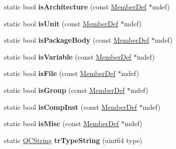 \begin{DoxyCompactItemize}
\item 
\hypertarget{class_vhdl_doc_gen_a70bc0f7e1c425824fc848c9d1eaa5af5}{static bool {\bfseries is\-Architecture} (const \hyperlink{class_member_def}{Member\-Def} $\ast$mdef)}\label{class_vhdl_doc_gen_a70bc0f7e1c425824fc848c9d1eaa5af5}

\item 
\hypertarget{class_vhdl_doc_gen_ad09fd50d897efd1d108c90d51a87c0ad}{static bool {\bfseries is\-Unit} (const \hyperlink{class_member_def}{Member\-Def} $\ast$mdef)}\label{class_vhdl_doc_gen_ad09fd50d897efd1d108c90d51a87c0ad}

\item 
\hypertarget{class_vhdl_doc_gen_acd1b3b462f582006aea12eec1ed47b30}{static bool {\bfseries is\-Package\-Body} (const \hyperlink{class_member_def}{Member\-Def} $\ast$mdef)}\label{class_vhdl_doc_gen_acd1b3b462f582006aea12eec1ed47b30}

\item 
\hypertarget{class_vhdl_doc_gen_abc090ca796d4365e4ec079ce4c8e8e07}{static bool {\bfseries is\-Variable} (const \hyperlink{class_member_def}{Member\-Def} $\ast$mdef)}\label{class_vhdl_doc_gen_abc090ca796d4365e4ec079ce4c8e8e07}

\item 
\hypertarget{class_vhdl_doc_gen_a1f35f5521f5b7a7f9751b679c5d2204a}{static bool {\bfseries is\-File} (const \hyperlink{class_member_def}{Member\-Def} $\ast$mdef)}\label{class_vhdl_doc_gen_a1f35f5521f5b7a7f9751b679c5d2204a}

\item 
\hypertarget{class_vhdl_doc_gen_ac09aca4988991e39e6bfb07fbf60f7cc}{static bool {\bfseries is\-Group} (const \hyperlink{class_member_def}{Member\-Def} $\ast$mdef)}\label{class_vhdl_doc_gen_ac09aca4988991e39e6bfb07fbf60f7cc}

\item 
\hypertarget{class_vhdl_doc_gen_ac53cf28cd95c19ea09df16b1bd949d4f}{static bool {\bfseries is\-Comp\-Inst} (const \hyperlink{class_member_def}{Member\-Def} $\ast$mdef)}\label{class_vhdl_doc_gen_ac53cf28cd95c19ea09df16b1bd949d4f}

\item 
\hypertarget{class_vhdl_doc_gen_a5529bcf9004c8f48851e15c64e8986fe}{static bool {\bfseries is\-Misc} (const \hyperlink{class_member_def}{Member\-Def} $\ast$mdef)}\label{class_vhdl_doc_gen_a5529bcf9004c8f48851e15c64e8986fe}

\item 
\hypertarget{class_vhdl_doc_gen_ac648fc9c785e6404b2f5801f1d7d5e78}{static \hyperlink{class_q_c_string}{Q\-C\-String} {\bfseries tr\-Type\-String} (uint64 type)}\label{class_vhdl_doc_gen_ac648fc9c785e6404b2f5801f1d7d5e78}


\end{DoxyCompactItemize}
